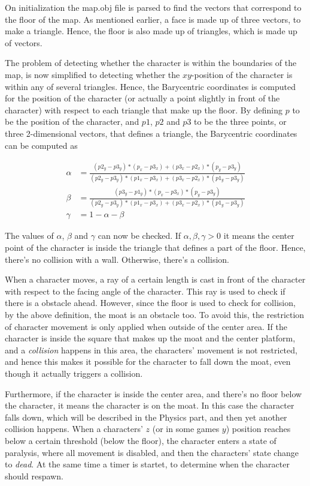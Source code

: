 \documentclass[12pt,a4paper,titlepage]{article}
\begin{document}
On initialization the map.obj file is parsed to find the vectors that
correspond to the floor of the map. As mentioned earlier, a face is made up
of three vectors, to make a triangle. Hence, the floor is also made up of
triangles, which is made up of vectors.

The problem of detecting whether the character is within the boundaries of the
map, is now simplified to detecting whether the $xy$-position of the
character is within any of several triangles. Hence, the Barycentric coordinates
is computed for the position of the character (or actually a point slightly
in front of the character) with respect to each triangle that make up the
floor. By defining $p$ to be the position of the character, and $p1$, $p2$
and $p3$ to be the three points, or three 2-dimensional vectors, that defines
a triangle, the Barycentric coordinates can be computed as

\begin{align*}
  \alpha &= \frac{(p2_y - p3_y) * (p_x - p3_x) + (p3_x - p2_x) * (p_y -
  p3_y)}{(p2_y - p3_y) * (p1_x - p3_x) + (p3_x - p2_x) * (p1_y - p3_y)}\\
  \beta &= \frac{(p3_y - p1_y) * (p_x - p3_x) * (p_y - p3_y)}{(p2_y -
  p3_y)*(p1_x-p3_x) + (p3_x - p2_x) * (p1_y - p3_y)}\\
  \gamma &= 1 - \alpha - \beta
\end{align*}

The values of $\alpha$, $\beta$ and $\gamma$ can now be checked. If
$\alpha,\beta,\gamma > 0$ it means the center point of the
character is inside the triangle that defines a part of the floor. Hence,
there's no collision with a wall. Otherwise, there's a collision.

When a character moves, a ray of a certain length is cast in front of the
character with respect to the facing angle of the character. This ray is used
to check if there is a obstacle ahead. However, since the floor is used to
check for collision, by the above definition, the moat is an obstacle too. To
avoid this, the restriction of character movement is only applied when
outside of the center area. If the character is inside the square that makes up the moat and
the center platform, and a \emph{collision} happens in this area, the characters'
movement is not restricted, and hence this makes it possible for the
character to fall down the moat, even though it actually triggers a
collision.

Furthermore, if the character is inside the center area, and there's no floor
below the character, it means the character is on the moat. In this case the
character falls down, which will be described in the Physics part, and then
yet another collision happens. When a characters' $z$ (or in some games $y$)
position reaches below a certain threshold (below the floor), the character
enters a state of paralysis, where all movement is disabled, and then the
characters' state change to \emph{dead}. At the same time a timer is startet, to
determine when the character should respawn.
\end{document}
